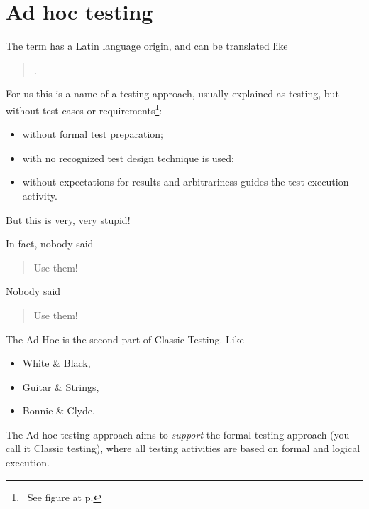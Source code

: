 \section{Ad hoc testing}
\label{sec:Ad hoc testing}

The term  has a Latin language origin, and can be translated like 

	\begin{quote}
	.
	\end{quote} 

For us this is a name of a testing approach, usually explained as testing, but without test cases or requirements\footnote{~See figure  at p.\pageref{fig:ClassicAdHocExploratoryTesting}}:

\begin{itemize}
\item without formal test preparation;
\item with no recognized test design technique is used;
\item without expectations for results and arbitrariness guides the test execution activity. 
\end{itemize}

But this is very, very stupid!

In fact, nobody said 
\begin{quote}
Use them!
\end{quote} 

Nobody said 
\begin{quote}
Use them!
\end{quote} 

The Ad Hoc is the second part of Classic Testing. Like 
\begin{itemize}
\item 
White \& Black, 
\item 
Guitar \& Strings, 
\item 
Bonnie \& Clyde.
\end{itemize}

The Ad hoc testing approach aims to \emph{support} the formal testing approach (you call it Classic testing), where all testing activities are based on formal and logical execution.

